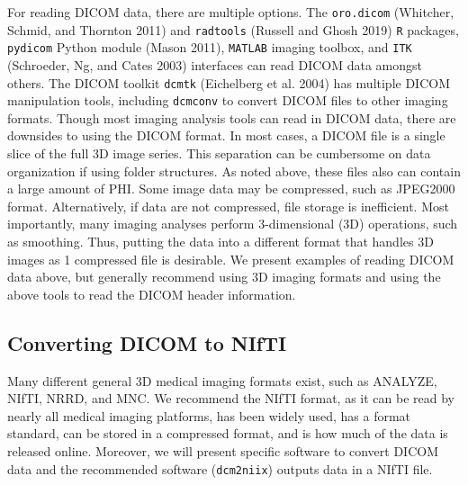\documentclass[]{elsarticle} %
\begin{document}
For reading DICOM data, there are multiple options. The \texttt{oro.dicom} (Whitcher, Schmid, and Thornton 2011) and \texttt{radtools} (Russell and Ghosh 2019) \texttt{R} packages, \texttt{pydicom} Python module (Mason 2011), \texttt{MATLAB} imaging toolbox, and \texttt{ITK} (Schroeder, Ng, and Cates 2003) interfaces can read DICOM data amongst others. The DICOM toolkit \texttt{dcmtk} (Eichelberg et al. 2004) has multiple DICOM manipulation tools, including \texttt{dcmconv} to convert DICOM files to other imaging formats. Though most imaging analysis tools can read in DICOM data, there are downsides to using the DICOM format. In most cases, a DICOM file is a single slice of the full 3D image series. This separation can be cumbersome on data organization if using folder structures. As noted above, these files also can contain a large amount of PHI. Some image data may be compressed, such as JPEG2000 format. Alternatively, if data are not compressed, file storage is inefficient. Most importantly, many imaging analyses perform 3-dimensional (3D) operations, such as smoothing. Thus, putting the data into a different format that handles 3D images as 1 compressed file is desirable. We present examples of reading DICOM data above, but generally recommend using 3D imaging formats and using the above tools to read the DICOM header information.

\hypertarget{converting-dicom-to-nifti}{%
\subsection{Converting DICOM to NIfTI}\label{converting-dicom-to-nifti}}

Many different general 3D medical imaging formats exist, such as ANALYZE, NIfTI, NRRD, and MNC. We recommend the NIfTI format, as it can be read by nearly all medical imaging platforms, has been widely used, has a format standard, can be stored in a compressed format, and is how much of the data is released online. Moreover, we will present specific software to convert DICOM data and the recommended software (\texttt{dcm2niix}) outputs data in a NIfTI file.
\end{document}
